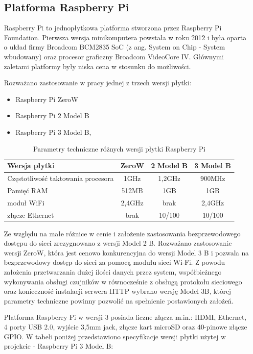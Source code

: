 \subsection{Platforma Raspberry Pi}

Raspberry Pi to jednopłytkowa platforma stworzona przez Raspberry Pi Foundation. Pierwsza wersja minikomputera powstała w roku 2012 i była oparta o układ firmy Broadcom BCM2835 SoC (z ang. System on Chip - System wbudowany) oraz procesor graficzny Broadcom VideoCore IV. Głównymi zaletami platformy były niska cena w stosunku do możliwości.

Rozważano zastosowanie w pracy jednej z trzech wersji płytki:
\begin{itemize}
\item Raspberry Pi ZeroW
\item Raspberry Pi 2 Model B
\item Raspberry Pi 3 Model B, 
\end{itemize}

\begin{table}[t]
\label{tabRpi}
\centering
\begin{tabular}{|l|c|c|c|}
  \hline 
  Wersja płytki & ZeroW & 2 Model B & 3 Model B\\
  \hline
  Częstotliwość taktowania procesora &1GHz&1,2GHz&900MHz\\
  \hline
  Pamięć RAM&512MB&1GB&1GB\\
  \hline
 moduł WiFi & 2,4GHz & brak & 2,4GHz\\
  \hline
  złącze Ethernet & brak &10/100& 10/100\\
  \hline
\end{tabular}
\caption{Parametry techniczne różnych wersji płytki Raspberry Pi
\cite{rpispecs}
} 
\end{table}

Ze względu na małe różnice w cenie i założenie zastosowania bezprzewodowego dostępu do sieci zrezygnowano z wersji Model 2 B. Rozważano zastosowanie wersji ZeroW, która jest cenowo konkurencyjna do wersji Model 3 B i pozwala na bezprzewodowy dostęp do sieci za pomocą modułu sieci Wi-Fi. Z powodu założenia przetwarzania dużej ilości danych przez system, współbieżnego wykonywania obsługi czujników
w równocześnie z obsługą protokołu sieciowego oraz konieczność instalacji serwera HTTP wybrano wersję Model 3B, której parametry techniczne powinny pozwolić na spełnienie postawionych założeń.

Platforma Raspberry Pi w wersji 3 posiada liczne złącza m.in.: HDMI, Ethernet, 4 porty USB 2.0, wyjście 3,5mm jack, złącze kart microSD oraz 40-pinowe złącze GPIO. W tabeli poniżej przedstawiono specyfikacje wersji płytki użytej w projekcie - Raspberry Pi 3 Model B:

